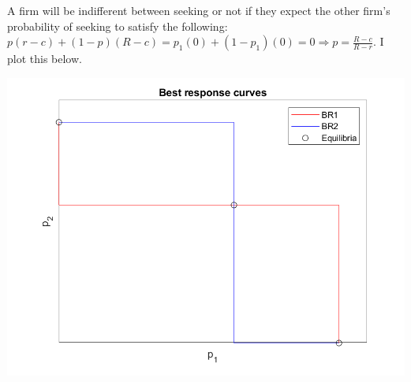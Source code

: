 \documentclass[11pt]{article} %
\begin{document}
A firm will be indifferent between seeking or not if they expect the other firm's probability of seeking to satisfy the following: $p(r-c) + (1-p)(R-c) = p_1(0) + (1-p_1)(0) = 0 \Rightarrow p = \frac{R-c}{R-r}.$ I plot this below.

\includegraphics{fig2}
\end{document}

